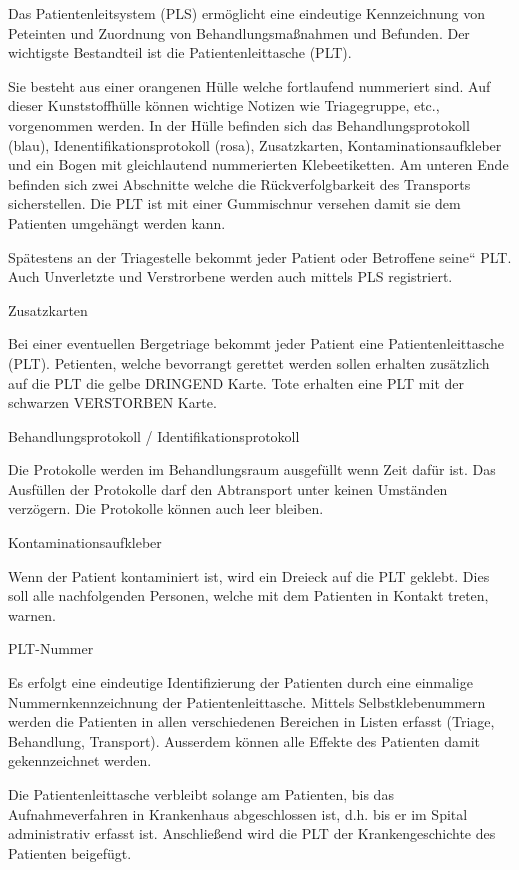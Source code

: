 \documentclass{article}
\begin{document}
Das Patientenleitsystem (PLS)
erm\"oglicht eine eindeutige Kennzeichnung von Peteinten und Zuordnung
von Behandlungsma{\ss}nahmen und Befunden. Der wichtigste Bestandteil
ist die Patientenleittasche
(PLT). 

Sie besteht aus einer orangenen H\"ulle welche fortlaufend nummeriert
sind. Auf dieser Kunststoffh\"ulle k\"onnen wichtige Notizen wie
Triagegruppe, etc., vorgenommen werden. In der H\"ulle befinden sich
das Behandlungsprotokoll (blau), Idenentifikationsprotokoll (rosa),
Zusatzkarten, Kontaminationsaufkleber und ein Bogen mit gleichlautend
nummerierten Klebeetiketten. Am unteren Ende befinden sich zwei
Abschnitte welche die R\"uckverfolgbarkeit des Transports
sicherstellen. Die PLT ist mit einer Gummischnur versehen damit sie dem
Patienten umgeh\"angt werden kann. 

Sp\"atestens an der Triagestelle bekommt jeder Patient oder Betroffene
{\quotedblbase}seine{\textquotedblleft} PLT. Auch Unverletzte und
Verstrorbene werden auch mittels PLS registriert.

Zusatzkarten

Bei einer eventuellen Bergetriage bekommt jeder Patient eine
Patientenleittasche (PLT). Petienten, welche bevorrangt gerettet werden
sollen erhalten zus\"atzlich auf die PLT die gelbe DRINGEND Karte. Tote
erhalten eine PLT mit der schwarzen VERSTORBEN Karte.

Behandlungsprotokoll / Identifikationsprotokoll

Die Protokolle werden im Behandlungsraum ausgef\"ullt wenn Zeit daf\"ur
ist. Das Ausf\"ullen der Protokolle darf den Abtransport unter keinen
Umst\"anden verz\"ogern. Die Protokolle k\"onnen auch leer bleiben.

Kontaminationsaufkleber

Wenn der Patient kontaminiert ist, wird ein Dreieck auf die PLT geklebt.
Dies soll alle nachfolgenden Personen, welche mit dem Patienten in
Kontakt treten, warnen.

PLT-Nummer

Es erfolgt eine eindeutige Identifizierung der Patienten durch eine
einmalige Nummernkennzeichnung der Patientenleittasche. Mittels
Selbstklebenummern werden die Patienten in allen verschiedenen
Bereichen in Listen erfasst (Triage, Behandlung, Transport). Ausserdem
k\"onnen alle Effekte des Patienten damit gekennzeichnet werden.

Die Patientenleittasche verbleibt solange am Patienten, bis das
Aufnahmeverfahren in Krankenhaus abgeschlossen ist, d.h. bis er im
Spital administrativ erfasst ist. Anschlie{\ss}end wird die PLT der
Krankengeschichte des Patienten beigef\"ugt.
\end{document}
